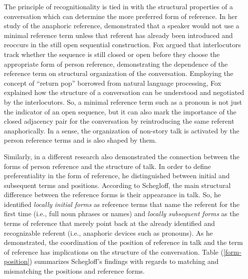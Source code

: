 \documentclass[12pt]{article}
\begin{document}
The principle of recognitionality is tied in with the structural properties of a conversation which can determine the more preferred form of reference. In her study of the anaphoric reference, \textcite{fox1987} demonstrated that a speaker would not use a minimal reference term unless that referent has already been introduced and reoccurs in the still open sequential construction. Fox argued that interlocutors track whether the sequence is still closed or open before they choose the appropriate form of person reference, demonstrating the dependence of the reference term on structural organization of the conversation. Employing the concept of ``return pop'' borrowed from natural language processing, Fox explained how the structure of a conversation can be understood and negotiated by the interlocutors. So, a minimal reference term such as a pronoun is not just the indicator of an open sequence, but it can also mark the importance of the closed adjacency pair for the conversation by reintroducing the same referent anaphorically. In a sense, the organization of non-story talk is activated by the person reference terms and is also shaped by them.   

Similarly, in a different research \textcite{schegloff1996b} also demonstrated the connection between the forms of person reference and the structure of talk. In order to define preferentiality in the form of reference, he distinguished between initial and subsequent terms and positions. According to Schegloff, the main structural difference between the reference forms is their appearance in talk. So, he identified \textit{locally initial forms} as reference terms that name the referent for the first time (i.e., full noun phrases or names) and\textit{ locally subsequent forms} as the terms of reference that merely point back at the already identified and recognizable referent (i.e., anaphoric devices such as pronouns). As he demonstrated, the coordination of the position of reference in talk and the term of reference has implications on the structure of the conversation. Table (\ref{form-position}) summarizes Schegloff's findings with regards to matching and mismatching the positions and reference forms.
\end{document}
